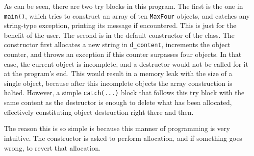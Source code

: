 As can be seen, there are two try blocks in this program. The first is the one in \texttt{main()}, which tries to construct an array of ten \texttt{MaxFour} objects, and catches any string-type exception, printing its message if encountered. This is just for the benefit of the user. The second is in the default constructor of the class. The constructor first allocates a new string in \texttt{d\_content}, increments the object counter, and throws an exception if this counter surpasses four objects. In that case, the current object is incomplete, and a destructor would not be called for it at the program's end. This would result in a memory leak with the size of a single object, because after this incomplete objects the array construction is halted. However, a simple \texttt{catch(...)} block that follows this try block with the same content as the destructor is enough to delete what has been allocated, effectively constituting object destruction right there and then.

The reason this is so simple is because this manner of programming is very intuitive. The constructor is asked to perform allocation, and if something goes wrong, to revert that allocation.
